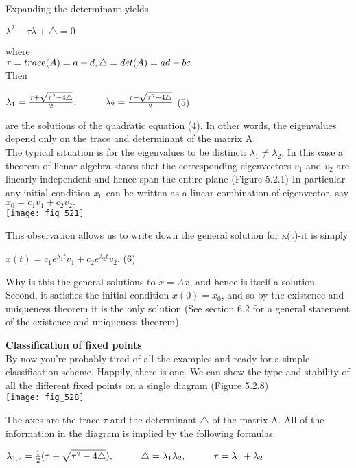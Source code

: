 \documentclass{article}
\newcommand\tab[1][1cm]{\hspace*{#1}}
\begin{document}
Expanding the determinant yields 
\begin{center}
$\lambda^{2}-\tau \lambda + \triangle = 0$
\end{center}
where
\\ \tab
$\tau = trace(A)=a+d, \\
\triangle = det(A)=ad-bc$ \\
Then
\begin{center}
$\lambda_{1}=\frac{\tau + \sqrt{\tau^{2}-4\triangle}}{2}, \tab \lambda_{2}=\frac{\tau-\sqrt{\tau^{2}-4\triangle}}{2}$ \tab (5)
\end{center}
are the solutions of the quadratic equation (4). In other words, the eigenvalues depend only on the trace and determinant of the matrix A. \\ \tab
The typical situation is for the eigenvalues to be distinct: $\lambda_{1} \neq \lambda_{2}$. In this case a theorem of lienar algebra states that the corresponding eigenvectors $v_{1}$ and $v_{2}$ are linearly independent and hence span the entire plane (Figure 5.2.1) In particular any initial condition $x_{0}$ can be written as a linear combination of eigenvector, say $x_{0}=c_{1}v_{1}+c_{2}v_{2}.$ \\

\texttt{[image: fig\_521]}

This observation allows us to write down the general solution for x(t)-it is simply
\begin{center}
$x(t)=c_{1}e^{\lambda_{1}{t}}v_{1} + c_{2}e^{\lambda_{2}t}v_{2}$. \tab (6)
\end{center}
Why is this the general solutions to $\dot{x}=Ax$, and hence is itself a solution. Second, it satisfies the initial condition $x(0)=x_{0}$, and so by the existence and uniqueness theorem it is the only solution (See section 6.2 for a general statement of the existence and uniqueness theorem).

\textbf {Classification of fixed points}
\\ \tab By now you're probably tired of all the examples and ready for a simple classification scheme. Happily, there is one. We can show the type and stability of all the different fixed points on a single diagram (Figure 5.2.8)
\\
\texttt{[image: fig\_528]}

The axes are the trace $\tau$ and the determinant $\triangle$ of the matrix A. All of the information in the diagram is implied by the following formulas:

\begin{center}
$\lambda_{1,2} = \frac{1}{2}(\tau + \sqrt{\tau^{2}-4\triangle}), \tab \triangle = \lambda_{1}\lambda_{2}, \tab \tau = \lambda_{1}+\lambda_{2}$
\end{center}
\end{document}
